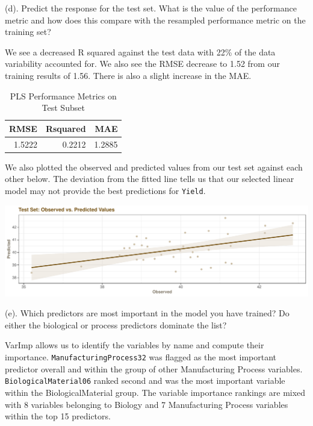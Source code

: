 \documentclass[]{report}
\begin{document}
\begin{subquestion}{(d).} Predict the response for the test set. What is the value of the performance metric and how does this compare with the resampled performance metric on the training set? 
\end{subquestion}

We see a decreased R squared against the test data with 22\% of the data
variability accounted for. We also see the RMSE decrease to 1.52 from
our training results of 1.56. There is also a slight increase in the
MAE.

\begin{table}[H]

\caption{\label{tab:kj-6.3d-1}PLS Performance Metrics on Test Subset}
\centering
\fontsize{8}{10}\selectfont
\begin{tabular}{rrr}
\toprule
\textbf{RMSE} & \textbf{Rsquared} & \textbf{MAE}\\
\midrule
\rowcolor{gray!6}  1.5222 & 0.2212 & 1.2885\\
\bottomrule
\end{tabular}
\end{table}

We also plotted the observed and predicted values from our test set
against each other below. The deviation from the fitted line tells us
that our selected linear model may not provide the best predictions for
\texttt{Yield}.

\includegraphics{Homework-Two_files/figure-latex/kj-6.3d-2-1.pdf}

\begin{subquestion}{(e).} Which predictors are most important in the model you have trained? Do either the biological or process predictors dominate the list? 
\end{subquestion}

VarImp allows us to identify the variables by name and compute their
importance. \texttt{ManufacturingProcess32} was flagged as the most
important predictor overall and within the group of other Manufacturing
Process variables. \texttt{BiologicalMaterial06} ranked second and was
the most important variable within the BiologicalMaterial group. The
variable importance rankings are mixed with 8 variables belonging to
Biology and 7 Manufacturing Process variables within the top 15
predictors.
\end{document}
